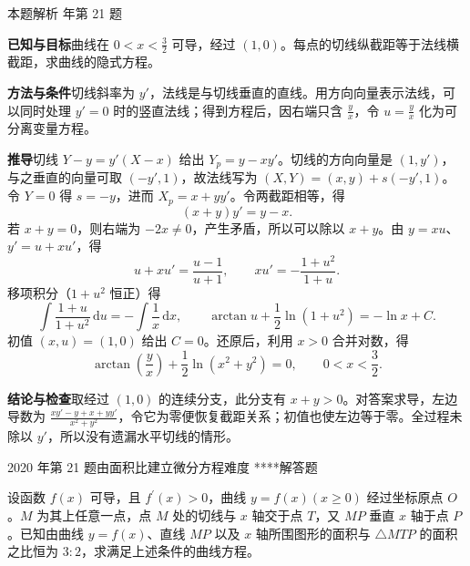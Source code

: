 \documentclass[UTF8,zihao=-4,fontset=fandol]{ctexart}
\newcounter{BankQuestion}
\newcommand{\QuestionPage}[7]{%
  \stepcounter{BankQuestion}%
  \par\noindent\begin{minipage}{\linewidth}
  \raggedright
  {\small\textcolor{black!60}{#3\quad #5\quad 难度 #7}\hfill\textcolor{accent}{#2}}\par\smallskip}
\newcommand{\QuestionEnd}{\end{minipage}\par\medskip}
\newcommand{\QuestionPage}[7]{%
  \clearpage
  \stepcounter{BankQuestion}%
  {\small\textcolor{accent}{#1\hfill #2}}\par\medskip
  {\small\textcolor{black!60}{#3\quad #5\quad 难度 #7\hfill \arabic{BankQuestion} / 234}}\par\vspace{9bp}}
\newcommand{\QuestionEnd}{}
\newenvironment{QuestionSolution}[1]{%
  \clearpage
  {\small\textcolor{black!60}{本题解析\quad #1}}\par\medskip
}{\par\clearpage}
\begin{document}
\begin{QuestionSolution}{2017 年第 21 题}
\textbf{已知与目标}\quad 曲线在 \(0<x<\frac{3}{2}\) 可导，经过 \((1,0)\)。每点的切线纵截距等于法线横截距，求曲线的隐式方程。

\textbf{方法与条件}\quad 切线斜率为 \(y'\)，法线是与切线垂直的直线。用方向向量表示法线，可以同时处理 \(y'=0\) 时的竖直法线；得到方程后，因右端只含 \(\frac{y}{x}\)，令 \(u=\frac{y}{x}\) 化为可分离变量方程。

\textbf{推导}\quad 切线 \(Y-y=y'(X-x)\) 给出 \(Y_p=y-xy'\)。切线的方向向量是 \((1,y')\)，与之垂直的向量可取 \((-y',1)\)，故法线写为 \((X,Y)=(x,y)+s(-y',1)\)。令 \(Y=0\) 得 \(s=-y\)，进而 \(X_p=x+yy'\)。令两截距相等，得
\[
(x+y)y'=y-x.
\]
若 \(x+y=0\)，则右端为 \(-2x\ne0\)，产生矛盾，所以可以除以 \(x+y\)。由 \(y=xu\)、\(y'=u+xu'\)，得
\[
u+xu'=\frac{u-1}{u+1},\qquad
xu'=-\frac{1+u^2}{1+u}.
\]
移项积分（\(1+u^2\) 恒正）得
\[
\int\frac{1+u}{1+u^2}\,\mathrm{d}u=-\int\frac{1}{x}\,\mathrm{d}x,
\qquad \arctan u+\frac{1}{2}\ln(1+u^2)=-\ln x+C.
\]
初值 \((x,u)=(1,0)\) 给出 \(C=0\)。还原后，利用 \(x>0\) 合并对数，得
\[
\boxed{\arctan\left(\frac{y}{x}\right)+\frac{1}{2}\ln(x^2+y^2)=0},
\qquad 0<x<\frac{3}{2}.
\]

\textbf{结论与检查}\quad 取经过 \((1,0)\) 的连续分支，此分支有 \(x+y>0\)。对答案求导，左边导数为 \(\frac{xy'-y+x+yy'}{x^2+y^2}\)，令它为零便恢复截距关系；初值也使左边等于零。全过程未除以 \(y'\)，所以没有遗漏水平切线的情形。
\end{QuestionSolution}

\QuestionPage{4.1 几类简单的微分方程}{解答题}{2020 年第 21 题}{4}{由面积比建立微分方程}{214 / 234}{****}
设函数 \(f\left( x \right)\) 可导，且 \(f^{\prime}\left( x \right)>0\)，曲线 \(y=f\left( x \right)\left( x\geq 0 \right)\) 经过坐标原点 \(O\)。\(M\) 为其上任意一点，点 \(M\) 处的切线与 \(x\) 轴交于点 \(T\)，又 \(MP\) 垂直 \(x\) 轴于点 \(P\)。已知由曲线 \(y=f\left( x \right)\)、直线 \(MP\) 以及 \(x\) 轴所围图形的面积与 \(\triangle MTP\) 的面积之比恒为 \(3:2\)，求满足上述条件的曲线方程。
\QuestionEnd
\end{document}
